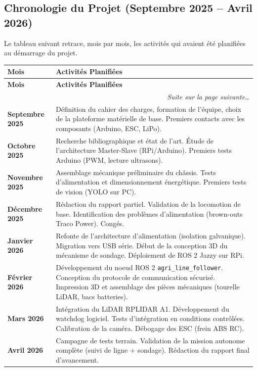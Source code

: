 \subsection{Chronologie du Projet (Septembre 2025 -- Avril 2026)}

Le tableau suivant retrace, mois par mois, les activités qui avaient été planifiées au démarrage du projet.

\renewcommand{\arraystretch}{1.5}
\begin{longtable}{|p{2.8cm}|p{11cm}|}
\hline
\rowcolor{headerblue!20}
\textbf{Mois} & \textbf{Activités Planifiées} \\
\hline
\endfirsthead
\hline
\rowcolor{headerblue!20}
\textbf{Mois} & \textbf{Activités Planifiées} \\
\hline
\endhead
\hline
\multicolumn{2}{r}{\textit{Suite sur la page suivante\ldots}}\\
\endfoot
\hline
\endlastfoot

\textbf{Septembre 2025}
& Définition du cahier des charges, formation de l'équipe, choix de la plateforme matérielle de base. Premiers contacts avec les composants (Arduino, ESC, LiPo). \\
\hline

\rowcolor{rowalt}
\textbf{Octobre 2025}
& Recherche bibliographique et état de l'art. Étude de l'architecture Master-Slave (RPi/Arduino). Premiers tests Arduino (PWM, lecture ultrasons). \\
\hline

\textbf{Novembre 2025}
& Assemblage mécanique préliminaire du châssis. Tests d'alimentation et dimensionnement énergétique. Premiers tests de vision (YOLO sur PC). \\
\hline

\rowcolor{rowalt}
\textbf{Décembre 2025}
& Rédaction du rapport partiel. Validation de la locomotion de base. Identification des problèmes d'alimentation (brown-outs Traco Power). Congés. \\
\hline

\textbf{Janvier 2026}
& Refonte de l'architecture d'alimentation (isolation galvanique). Migration vers USB série. Début de la conception 3D du mécanisme de sondage. Déploiement de ROS 2 Jazzy sur RPi. \\
\hline

\rowcolor{rowalt}
\textbf{Février 2026}
& Développement du noeud ROS 2 \texttt{agri\_line\_follower}. Conception du protocole de communication sécurisé. Impression 3D et assemblage des pièces mécaniques (tourelle LiDAR, bacs batteries). \\
\hline

\textbf{Mars 2026}
& Intégration du LiDAR RPLIDAR A1. Développement du watchdog logiciel. Tests d'intégration en conditions contrôlées. Calibration de la caméra. Débogage des ESC (frein ABS RC). \\
\hline

\rowcolor{rowalt}
\textbf{Avril 2026}
& Campagne de tests terrain. Validation de la mission autonome complète (suivi de ligne + sondage). Rédaction du rapport final d'avancement. \\
\hline

\end{longtable}

